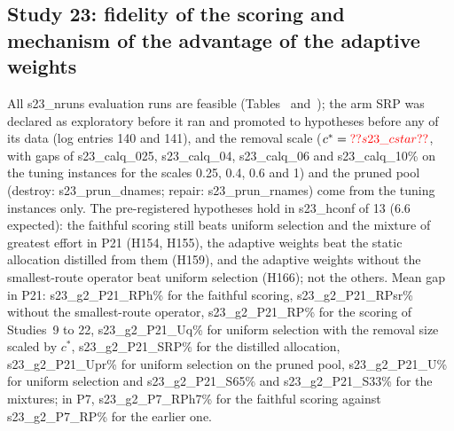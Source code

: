 \subsection{Study 23: fidelity of the scoring and mechanism of the advantage of the adaptive weights}\label{sec:s23}
All \num{s23_nruns} evaluation runs are feasible (Tables~ and~); the arm SRP was declared as exploratory before it ran and promoted to hypotheses before any of its data (log entries 140 and 141), and the removal scale ($c^*=\num{s23_cstar}$, with gaps of \num{s23_calq_025}, \num{s23_calq_04}, \num{s23_calq_06} and \num{s23_calq_10}\% on the tuning instances for the scales 0.25, 0.4, 0.6 and 1) and the pruned pool (destroy: \num{s23_prun_dnames}; repair: \num{s23_prun_rnames}) come from the tuning instances only. The pre-registered hypotheses hold in \num{s23_hconf} of 13 (6.6 expected): the faithful scoring still beats uniform selection and the mixture of greatest effort in P21 (H154, H155), the adaptive weights beat the static allocation distilled from them (H159), and the adaptive weights without the smallest-route operator beat uniform selection (H166); not the others. Mean gap in P21: \num{s23_g2_P21_RPh}\% for the faithful scoring, \num{s23_g2_P21_RPsr}\% without the smallest-route operator, \num{s23_g2_P21_RP}\% for the scoring of Studies~9 to 22, \num{s23_g2_P21_Uq}\% for uniform selection with the removal size scaled by $c^*$, \num{s23_g2_P21_SRP}\% for the distilled allocation, \num{s23_g2_P21_Upr}\% for uniform selection on the pruned pool, \num{s23_g2_P21_U}\% for uniform selection and \num{s23_g2_P21_S65}\% and \num{s23_g2_P21_S33}\% for the mixtures; in P7, \num{s23_g2_P7_RPh7}\% for the faithful scoring against \num{s23_g2_P7_RP}\% for the earlier one.

